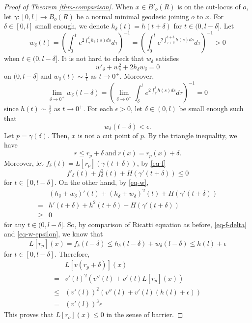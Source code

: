 \documentclass[12pt]{amsart}
\def\e{\epsilon}
\theoremstyle{definition}
\theoremstyle{remark}
\numberwithin{equation}{section}
\begin{document}
\begin{proof}[Proof of Theorem \ref{thm-comparison}]
When $x\in B'_o(R)$ is on the cut-locus of $o$, let $\gamma:[0,l]\to B_o(R)$ be a normal minimal geodesic joining $o$ to $x$. For $\delta\in [0,l]$ small enough, we denote $h_\delta(t)=h(t+\delta)$ for $t\in (0,l-\delta]$. Let
\begin{equation}
w_\delta(t)=\left(\int_0^te^{2\int_\tau^t h_\delta(s)ds}d\tau\right)^{-1}=\left(\int_0^te^{2\int_{\tau+\delta}^{t+\delta} h(s)ds}d\tau\right)^{-1}>0
\end{equation}
when $t\in (0,l-\delta]$. It is not hard to check that $w_\delta$ satisfies
\begin{equation}\label{eq-w}
w'_\delta+w_\delta^2+2h_\delta w_\delta=0
\end{equation}
on $(0,l-\delta]$ and $w_\delta(t)\sim\frac1t$ as $t\to0^+$. Moreover,
\begin{equation}
\lim_{\delta\to 0^+}w_\delta(l-\delta)=\left(\lim_{\delta\to 0^+}\int_\delta^{l}e^{2\int_{\tau}^{l} h(s)ds}d\tau\right)^{-1}=0
\end{equation}
since $h(t)\sim\frac1t$ as $t\to 0^+$. For each $\e>0$, let $\delta\in (0,l)$ be small enough such that
\begin{equation}\label{eq-w-epsilon}
w_\delta(l-\delta)<\e.
\end{equation}
Let $p=\gamma(\delta)$. Then, $x$ is not a cut point of $p$. By the triangle inequality, we have
\begin{equation}
r\leq r_p+\delta\ \mbox{and}\ r(x)=r_p(x)+\delta.
\end{equation}
Moreover,  let $f_\delta(t)=L[r_p](\gamma(t+\delta))$, by \eqref{eq-f}
\begin{equation}
f'_\delta(t)+f_\delta^2(t)+H(\gamma'(t+\delta))\leq 0
\end{equation}
for $t\in [0,l-\delta]$. On the other hand, by \eqref{eq-w},
\begin{equation}\label{eq-f-delta}
\begin{split}
&(h_\delta+w_\delta)'(t)+(h_\delta+w_\delta)^2(t)+H(\gamma'(t+\delta))\\
=&h'(t+\delta)+h^2(t+\delta)+H(\gamma'(t+\delta))\\
\geq&0
\end{split}
\end{equation}
for any $t\in (0,l-\delta]$. So, by comparison of Ricatti equation as before, \eqref{eq-f-delta} and \eqref{eq-w-epsilon}, we know that
\begin{equation}
L[r_p](x)=f_\delta(l-\delta)\leq h_\delta(l-\delta)+w_\delta(l-\delta)\leq h(l)+\e
\end{equation}
for $t\in [0,l-\delta]$. Therefore,
\begin{equation}
\begin{split}
&L[v(r_p+\delta)](x)\\
=&v'(l)^2(v''(l)+v'(l)L[r_p](x))\\
\leq&(v'(l))^2(v''(l)+v'(l)(h(l)+\e))\\
=&(v'(l))^3\e
\end{split}
\end{equation}
This proves that $L[r_o](x)\leq 0$ in the sense of barrier.


\end{proof}
\end{document}
